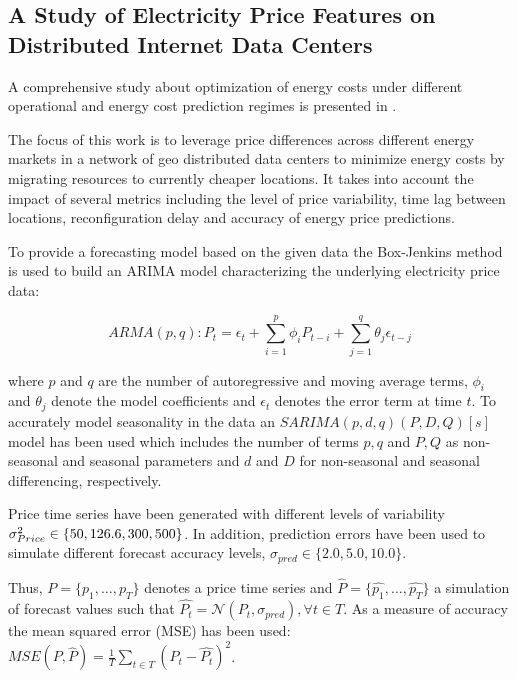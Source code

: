 
\subsection{A Study of Electricity Price Features on Distributed Internet Data Centers}

A comprehensive study about optimization of energy costs under different operational and energy cost prediction regimes is presented in \cite{de2013study}. 

The focus of this work is to leverage price differences across different energy markets in a network of geo distributed data centers to minimize energy costs by migrating resources to currently cheaper locations. It takes into account the impact of several metrics including the level of price variability, time lag between locations, reconfiguration delay and accuracy of energy price predictions. 

To provide a forecasting model based on the given data the Box-Jenkins method is used to build an ARIMA model characterizing the underlying electricity price data:

\[ ARMA(p,q) : P_t = \epsilon_t + \sum_{i=1}^{p}{\phi_i P_{t-i}} + \sum_{j=1}^{q}{\theta_j \epsilon_{t-j}}\] 

where $p$ and $q$ are the number of autoregressive and moving average terms, $\phi_i$ and $\theta_j$ denote the model coefficients and $\epsilon_t$ denotes the error term at time $t$. To accurately model seasonality in the data an $SARIMA(p,d,q)(P,D,Q)[s]$ model has been used which includes the number of terms $p,q$ and $P,Q$ as non-seasonal and seasonal parameters and $d$ and $D$ for non-seasonal and seasonal differencing, respectively. 

Price time series have been generated with different levels of variability $\sigma_{Price}^{2} \in \{50, 126.6, \allowbreak 300, 500\}$. In addition, prediction errors have been used to simulate different forecast accuracy levels, $\sigma_{pred} \in \{2.0, 5.0, 10.0\}$. 

Thus, $P = \{p_1,\ldots,p_T \}$ denotes a price time series and $\hat{P} = \{\hat{p_1},\ldots,\hat{p_T}\}$ a simulation of forecast values such that 
$\hat{P_t} = \mathcal{N}(P_t, \sigma_{pred}), \forall t \in T$. As a measure of accuracy the mean squared error (MSE) has been used: 
$MSE(P,\hat{P}) = \frac{1}{T} \sum_{t \in T}{(P_t - \hat{P_t})^2}$. 

